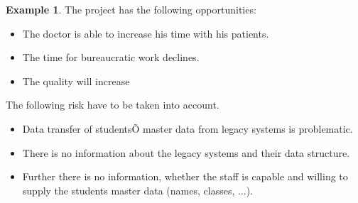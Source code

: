 \documentclass[12pt]{article}
\theoremstyle{definition}
\newtheorem{example}{Example}
\begin{document}
\begin{example}
The project has the following opportunities:
\begin{itemize}
\item The doctor is able to increase his time with his patients.
\item The time for bureaucratic work declines.
\item The quality will increase
\end{itemize}

The following risk have to be taken into account.
\begin{itemize}
\item Data transfer of studentsÕ master data from legacy systems is problematic.
\item There is no information about the legacy systems and their data structure.
\item Further there is no information, whether the staff is capable and willing to supply the students master data (names, classes, ...).
\end{itemize}

\end{example}

\pagebreak
\end{document}
